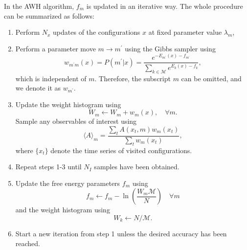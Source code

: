 In the AWH algorithm, $f_m$ is updated in an iterative way. The whole procedure can be summarized as follows:
\begin{enumerate}[label=(\arabic*)]
	\item Perform $N_x$ updates of the configurations $x$ at fixed parameter value $\lambda_m$,
	\item Perform a parameter move $m \to m^\prime$ using the Gibbs sampler using
	\begin{equation}
		w_{m^\prime m}(x)=P(m^\prime|x)=\frac{e^{-E_{m^\prime}(x)-f_{m^\prime}}}{\sum\limits_{k\in \mathcal{M}}e^{E_k(x)-f_k}},
	\end{equation}
    which is independent of $m$. Therefore, the subscript $m$ can be omitted, and we denote it as $w_{m^\prime}$. 
    \item Update the weight histogram using
    \begin{equation}
        W_m\leftarrow W_m+w_{m}(x),\quad \forall m. 
    \end{equation}
    Sample any observables of interest using
    \begin{equation}
    	\langle A\rangle_m=\frac{\sum_t A(x_t,m)w_{m}(x_t)}{\sum_t w_{m}(x_t)},
    \end{equation}
    where $\{x_t\}$ denote the time series of visited configurations.
    \item Repeat steps 1-3 until $N_I$ samples have been obtained.
    \item Update the free energy parameters $f_m$ using
    \begin{equation}
    	f_m\leftarrow f_m-\ln\left(\frac{W_m\mathcal{M}}{N}\right) \quad \forall m
    \end{equation}
    and the weight histogram using
    \begin{equation}
    	W_k\leftarrow N/\mathcal{M}.
    \end{equation}
    \item Start a new iteration from step 1 unless the desired accuracy has been reached.
\end{enumerate}
